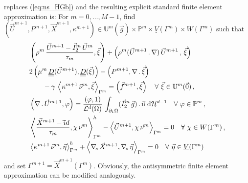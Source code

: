 \documentclass[a4paper,12pt,onecolumn]{article}
\newcommand{\vol}{\mathcal{L}^d}
\newcommand{\dH}[1]{\;{\rm d}{\cal H}^{#1}} %
\newcommand{\Vh}{\underline{V}(\Gamma^m)}
\newcommand{\Wh}{W(\Gamma^m)}
\newcommand{\uspacedisc}[2]{\mathbb{U}^{#2}(\vec{#1})}
\newcommand{\pspace}{\mathbb{P}}
\newcommand{\nabs}{\nabla_{\!s}}
\newcommand{\id}{\rm id}
\newcommand{\unitn}{\vec{\rm n}}
\newcommand{\mat}[1]{\underline{\underline{#1}}\rule{0pt}{0pt}}
\begin{document}
replaces (\ref{eq:ns_HGb}) and the resulting explicit standard finite element
approximation is: For $m=0,\ldots, M-1$, find $(\vec U^{m+1}, P^{m+1}, \vec
X^{m+1}, \kappa^{m+1}) \in \uspacedisc{g}{m}\times \pspace^m \times \Vh \times
\Wh$ such that
\begin{subequations}
\begin{align}
& \left( \rho^m\,\frac{\vec U^{m+1} - \vec I^m_2\,\vec U^m}{\tau_m}, \vec
\xi \right) + \left(\rho^m( \vec U^{m+1}\,.\,\nabla)\,\vec U^{m+1}\,,
\,\vec \xi \right)\nonumber \\
& 2\left(\mu^m\,\mat D(\vec U^{m+1}), \mat D(\vec \xi) \right)
- \left(P^{m+1}, \nabla\,.\,\vec \xi\right) \nonumber \\
& \qquad - \gamma\,\left\langle
\kappa^{m+1}\,\vec\nu^m,\vec\xi\right\rangle_{\Gamma^m}
= \left(\vec f^{m+1},\vec \xi\right) \quad \forall\ \vec\xi \in
\uspacedisc{0}{m}\,, \label{eq:HGcorrecteda}\\
& \left(\nabla\,.\,\vec U^{m+1}, \varphi\right)  =
\frac{\left(\varphi, 1\right)}{\vol(\Omega)}\, \int_{\partial_1\Omega}
(\vec I^m_2\,\vec g) \,.\, \unitn \dH{d-1}
\quad \forall\ \varphi \in \pspace^m\,,\label{eq:HGcorrectedb} \\
&  \left\langle \frac{\vec X^{m+1} - \vec\id}{\tau_m} ,\chi\,\vec\nu^m
\right\rangle_{\Gamma^m}^h - \left\langle \vec U^{m+1}, \chi\,\vec\nu^m
\right\rangle_{\Gamma^m}  = 0 \quad \forall\ \chi \in \Wh\,,
\label{eq:HGcorrectedc} \\
& \left\langle \kappa^{m+1}\,\vec\nu^m, \vec\eta \right\rangle_{\Gamma^m}^h
+ \left\langle \nabs\,\vec X^{m+1}, \nabs\,\vec \eta \right\rangle_{\Gamma^m} =
0 \quad \forall\ \vec\eta \in \Vh \label{eq:HGcorrectedd}
\end{align}
\end{subequations}
and set $\Gamma^{m+1} = \vec X^{m+1}(\Gamma^m)$. Obviously, the antisymmetric
finite element approximation can be modified analogously.
\end{document}
